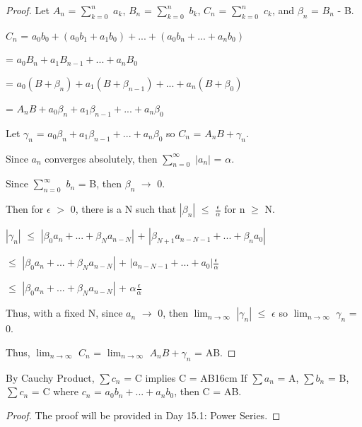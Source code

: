     \begin{proof}
        Let $A_n$ = $\sum_{k=0}^{n}$ $a_k$, $B_n$ = $\sum_{k=0}^{n}$ $b_k$,
        $C_n$ = $\sum_{k=0}^{n}$ $c_k$, and $\beta_n$ = $B_n$ - B.

        \hspace{1cm}
        $C_n$
        = $a_0b_0 + (a_0b_1 + a_1b_0) + ... + (a_0b_n + ... + a_nb_0)$
        
        \hspace{1.6cm}
        = $a_0B_n + a_1B_{n-1} + ... + a_nB_0$

        \hspace{1.6cm}
        = $a_0(B + \beta_n) + a_1(B + \beta_{n-1}) + ... + a_n(B + \beta_{0})$

        \hspace{1.6cm}
        = $A_nB + a_0\beta_n + a_1\beta_{n-1} + ... + a_n\beta_0$

        Let $\gamma_n$ = $a_0\beta_n + a_1\beta_{n-1} + ... + a_n\beta_0$
        so $C_n$ = $A_nB + \gamma_n$.

        Since $a_n$ converges absolutely, then
        $\sum_{n=0}^{\infty}$ $|a_n|$ = $\alpha$.

        Since $\sum_{n=0}^{\infty}$ $b_n$ = B, then $\beta_n$ $\rightarrow$ 0.
        
        Then for $\epsilon$ $>$ 0, there is a N such that
        $|\beta_n|$ $\leq$ $\frac{\epsilon}{\alpha}$ for n $\geq$ N.

        \hspace{1cm}
        $|\gamma_n|$
        $\leq$ $|\beta_0a_n + ... + \beta_Na_{n-N}|$
        + $|\beta_{N+1}a_{n-N-1} + ... + \beta_na_{0}|$

        \hspace{1.75cm}
        $\leq$ $|\beta_0a_n + ... + \beta_Na_{n-N}|$
        + $|a_{n-N-1} + ... + a_{0}|$$\frac{\epsilon}{\alpha}$

        \hspace{1.75cm}
        $\leq$ $|\beta_0a_n + ... + \beta_Na_{n-N}|$
        + $\alpha \frac{\epsilon}{\alpha}$

        Thus, with a fixed N, since $a_n$ $\rightarrow$ 0, then
        $\lim_{n \rightarrow \infty}$ $|\gamma_n|$ $\leq$ $\epsilon$
        so $\lim_{n \rightarrow \infty}$ $\gamma_n$ = 0.

        Thus, $\lim_{n \rightarrow \infty}$ $C_n$
        = $\lim_{n \rightarrow \infty}$ $A_nB + \gamma_n$ = AB.
    \end{proof}

    \vspace{0.5cm}



    \begin{wtheorem}{By Cauchy Product, $\sum c_n$ = C implies C = AB}{16cm}
        If $\sum a_n$ = A, $\sum b_n$ = B, $\sum c_n$ = C
        where $c_n$ = $a_0b_n + ... + a_nb_0$, then C = AB.
    \end{wtheorem}

    \begin{proof}
        The proof will be provided in Day 15.1: Power Series.
    \end{proof}




    